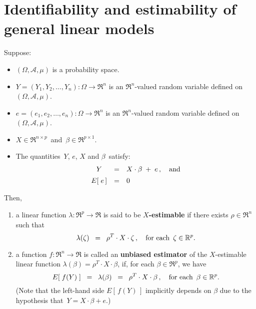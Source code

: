 

\section{Identifiability and estimability of general linear models}
\setcounter{theorem}{0}
\setcounter{equation}{0}

\renewcommand{\theenumi}{\roman{enumi}}
\renewcommand{\labelenumi}{\textnormal{(\theenumi)}$\;\;$}


\begin{definition}
\mbox{}
\vskip 0.1cm
\noindent
Suppose:
\begin{itemize}
\item
	$(\Omega,\mathcal{A},\mu)$ is a probability space.
\item
	$Y = (Y_{1}, Y_{2}, \ldots, Y_{n}) : \Omega \longrightarrow \Re^{n}$ is an $\Re^{n}$-valued random variable
	defined on $(\Omega,\mathcal{A},\mu)$.
\item
	$e = (e_{1}, e_{2}, \ldots, e_{n}) : \Omega \longrightarrow \Re^{n}$ is an $\Re^{n}$-valued random variable
	defined on $(\Omega,\mathcal{A},\mu)$.
\item
	$X \in \Re^{n \times p}$\, and \,$\beta \in \Re^{p \times 1}$.
\item
	The quantities \,$Y$, $e$, $X$ and $\beta$\, satisfy:
	\begin{equation*}
	\begin{array}{ccl}
	Y & = & X \cdot \beta \; + \; e\,, \quad\textnormal{and}
	\\
	E\!\left[\;e\,\right] & \overset{{\color{white}\vert}}{=} & 0
	\end{array}
	\end{equation*}
\end{itemize}
Then,
\begin{enumerate}
\item
	a linear function $\lambda : \Re^{p} \longrightarrow \Re$ is said to be \textbf{$X$-estimable}
	if there exists $\rho \in \Re^{n}$ such that
	\begin{equation*}
	\lambda(\zeta) \;\; =\;\; \rho^{T} \cdot X \cdot \zeta\,,
	\quad
	\textnormal{for each \,$\zeta \in \Re^{p}$}.
	\end{equation*}
\item
	a function $f : \Re^{n} \longrightarrow \Re$ is called an \textbf{unbiased estimator}
	of the $X$-estimable linear function $\lambda(\beta) = \rho^{T} \cdot X \cdot \beta$,
	if, for each $\beta \in \Re^{p}$, we have
	\begin{equation*}
	E\!\left[\;f(Y)\;\right] \;\; =\;\; \lambda(\beta) \;\;=\;\; \rho^{T} \cdot X \cdot \beta\,,
	\quad
	\textnormal{for each \,$\beta \in \Re^{p}$}.
	\end{equation*}
	(Note that the left-hand side $E\!\left[\,f(Y)\,\right]$ implicitly depends on $\beta$
	due to the hypothesis that \,$Y = X \cdot \beta + e$.)
\end{enumerate}
\end{definition}


